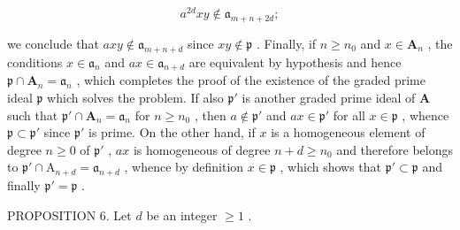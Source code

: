 \[
a ^ {2d} x y \notin \mathfrak {a} _ {m + n + 2 d};
\]

we conclude that \(axy \notin \mathfrak{a}_{m+n+d}\) since \(xy \notin \mathfrak{p}\) . Finally, if \(n \geqslant n_0\) and \(x \in \mathbf{A}_n\) , the conditions \(x \in \mathfrak{a}_n\) and \(ax \in \mathfrak{a}_{n+d}\) are equivalent by hypothesis and hence \(\mathfrak{p} \cap \mathbf{A}_n = \mathfrak{a}_n\) , which completes the proof of the existence of the graded prime ideal \(\mathfrak{p}\) which solves the problem. If also \(\mathfrak{p}'\) is another graded prime ideal of \(\mathbf{A}\) such that \(\mathfrak{p}' \cap \mathbf{A}_n = \mathfrak{a}_n\) for \(n \geqslant n_0\) , then \(a \notin \mathfrak{p}'\) and \(ax \in \mathfrak{p}'\) for all \(x \in \mathfrak{p}\) , whence \(\mathfrak{p} \subset \mathfrak{p}'\) since \(\mathfrak{p}'\) is prime. On the other hand, if \(x\) is a homogeneous element of degree \(n \geqslant 0\) of \(\mathfrak{p}'\) , \(ax\) is homogeneous of degree \(n + d \geqslant n_0\) and therefore belongs to \(\mathfrak{p}' \cap \mathrm{A}_{n+d} = \mathfrak{a}_{n+d}\) , whence by definition \(x \in \mathfrak{p}\) , which shows that \(\mathfrak{p}' \subset \mathfrak{p}\) and finally \(\mathfrak{p}' = \mathfrak{p}\) .

PROPOSITION 6. Let \(d\) be an integer \(\geqslant 1\) .

